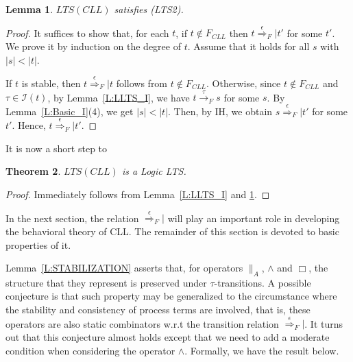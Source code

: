 \documentclass{elsarticle}
\theoremstyle{plain}
\newtheorem{theorem}{Theorem}[section]
\newtheorem{lemma}[theorem]{Lemma}
\theoremstyle{definition}
\begin{document}
\begin{lemma}\label{L:LLTS_II}
    $LTS(CLL)$ satisfies (LTS2).
\end{lemma}
\begin{proof}
    It suffices to show that, for each $t$, if $t\notin F_{CLL}$ then $t \stackrel{\epsilon}{\Longrightarrow}_F|t'$ for some $t'$.
   We prove it by induction on the degree of $t$.
   Assume that it holds for all $s$ with $|s|<|t|$.

   If $t$ is stable, then $t \stackrel{\epsilon}{\Longrightarrow}_F|t$ follows from $t\notin F_{CLL}$.
   Otherwise, since $t\notin F_{CLL}$ and $\tau \in {\mathcal I}(t)$, by Lemma~\ref{L:LLTS_I}, we have $t \stackrel{\tau}{\longrightarrow}_F s$ for some $s$.
   By Lemma~\ref{L:Basic_I}(4), we get $|s|<|t|$. Then, by IH, we obtain  $s \stackrel{\epsilon}{\Longrightarrow}_F|t'$ for some $t'$. Hence, $t \stackrel{\epsilon}{\Longrightarrow}_F|t'$.
\end{proof}

It is now a short step to

\begin{theorem}\label{L:LLTS}
    $LTS({CLL})$ is a Logic LTS.
\end{theorem}
\begin{proof}
    Immediately follows from Lemma~\ref{L:LLTS_I} and \ref{L:LLTS_II}.
\end{proof}

In the next section, the relation $\stackrel{\epsilon}{\Longrightarrow}_F|$ will play an important role in developing the behavioral theory of CLL. The remainder of this section is devoted to basic properties of it.

Lemma~\ref{L:STABILIZATION} asserts that, for operators $\parallel_A$, $\wedge$ and $\Box$, the structure that they represent is preserved under $\tau$-transitions.
A possible conjecture is that such property may be generalized to the circumstance where the stability and consistency of process terms are involved, that is, these operators are also static combinators w.r.t the transition relation  $\stackrel{\epsilon}{\Longrightarrow}_F|$.
It turns out that this conjecture almost holds except that we need to add a moderate condition when considering the operator $\wedge$. Formally, we have the result below.
\end{document}
